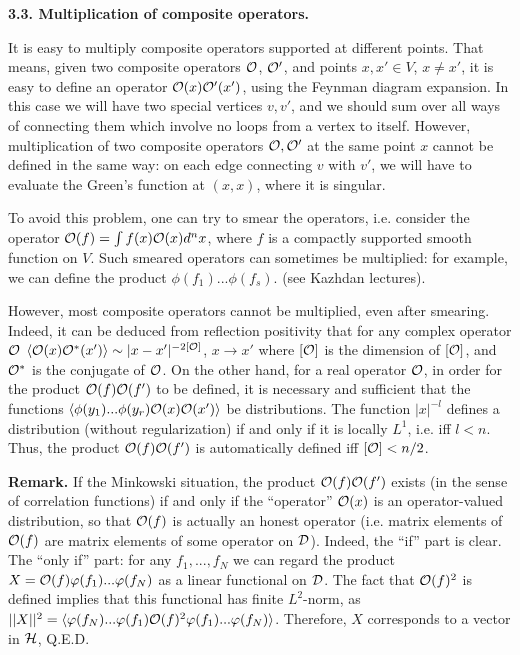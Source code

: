 \documentclass[11pt]{article}
\def\O{{\cal O}}
\def\<{\langle}
\def\>{\rangle}
\begin{document}
{\bf 3.3. Multiplication of composite operators.} 

It is easy to multiply composite operators supported at different points.
That means, given two composite operators $\O$, $\O'$, 
and points $x,x'\in V$, $x\ne x'$, it is easy to define
an operator $\O(x)\O'(x')$, using the Feynman diagram expansion. 
In this case we will have two special vertices $v,v'$, 
and we should sum over all ways of connecting them which involve no loops
from a vertex to itself.
However, multiplication of two composite operators $\O,\O'$
at the same point $x$ cannot be 
defined in the same way: on each edge connecting $v$ with $v'$, 
we will have to evaluate the Green's function at $(x,x)$, where it is 
singular. 

To avoid this problem, one can try to smear the operators, i.e. consider
the operator $\O(f)=\int f(x)\O(x)d^nx$, where $f$ is a compactly supported
smooth function on $V$. Such smeared operators can sometimes be
multiplied: for example, we can define the product $\phi(f_1)...\phi(f_s)$.
(see Kazhdan lectures).

However, most composite operators cannot be
multiplied, even after smearing. Indeed, 
it can be deduced from reflection positivity
that for any complex operator $\O$ 
$\<\O(x)\O^*(x')\>\sim |x-x'|^{-2[\O]}$, $x\to x'$ where
$[\O]$ is the dimension of $[\O]$, and $\O^*$ is the conjugate of $\O$. 
On the other hand, for a real operator $\O$,
in order for the product 
$\O(f)\O(f')$ 
to be defined, it is necessary and sufficient that 
the functions
$\<\phi(y_1)...\phi(y_r)\O(x)\O(x')\>$ be distributions. 
The function $|x|^{-l}$ defines a distribution 
(without regularization) if and only if 
it is locally $L^1$, i.e. iff $l<n$. Thus, the product 
$\O(f)\O(f')$ is automatically
defined iff $[\O]<n/2$. 

{\bf Remark.}
If the Minkowski situation, the product $\O(f)\O(f')$
exists (in the sense of correlation functions) 
if and only if the ``operator'' $\O(x)$ is an operator-valued
distribution, so that  
$\O(f)$ is actually an honest operator (i.e. matrix elements
of $\O(f)$ are matrix elements of some operator on ${\cal D}$).
Indeed, the ``if'' part is clear. The ``only if'' part: 
for any $f_1,...,f_N$ we can regard the product 
$X=\O(f)\varphi(f_1)...\varphi(f_N)$ as a linear functional on ${\cal D}$.
The fact that $\O(f)^2$ is defined implies that this functional
has finite $L^2$-norm, as $||X||^2=
\<\varphi(f_N)...\varphi(f_1)
\O(f)^2\varphi(f_1)...\varphi(f_N)\>$. Therefore, $X$ corresponds to 
a vector in ${\cal H}$, Q.E.D.
\end{document}
